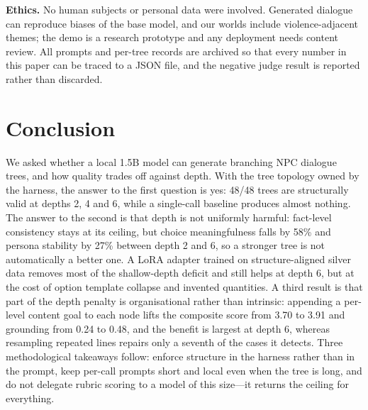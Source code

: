 \documentclass[conference]{IEEEtran}
\begin{document}
\textbf{Ethics.} No human subjects or personal data were involved. Generated dialogue can reproduce
biases of the base model, and our worlds include violence-adjacent themes; the demo is a research
prototype and any deployment needs content review. All prompts and per-tree records are archived so
that every number in this paper can be traced to a JSON file, and the negative judge result is
reported rather than discarded.

\section{Conclusion}
We asked whether a local 1.5B model can generate branching NPC dialogue trees, and how quality
trades off against depth. With the tree topology owned by the harness, the answer to the first
question is yes: 48/48 trees are structurally valid at depths 2, 4 and 6, while a single-call
baseline produces almost nothing. The answer to the second is that depth is not uniformly harmful:
fact-level consistency stays at its ceiling, but choice meaningfulness falls by 58\% and persona
stability by 27\% between depth 2 and 6, so a stronger tree is not automatically a better one. A
LoRA adapter trained on structure-aligned silver data removes most of the shallow-depth deficit and
still helps at depth 6, but at the cost of option template collapse and invented quantities. A third
result is that part of the depth penalty is organisational rather than intrinsic: appending a
per-level content goal to each node lifts the composite score from 3.70 to 3.91 and grounding from
0.24 to 0.48, and the benefit is largest at depth 6, whereas resampling repeated lines repairs only a
seventh of the cases it detects. Three methodological takeaways follow: enforce structure in the
harness rather than in the prompt, keep per-call prompts short and local even when the tree is long,
and do not delegate rubric scoring to a model of this size---it returns the ceiling for everything.



\end{document}
